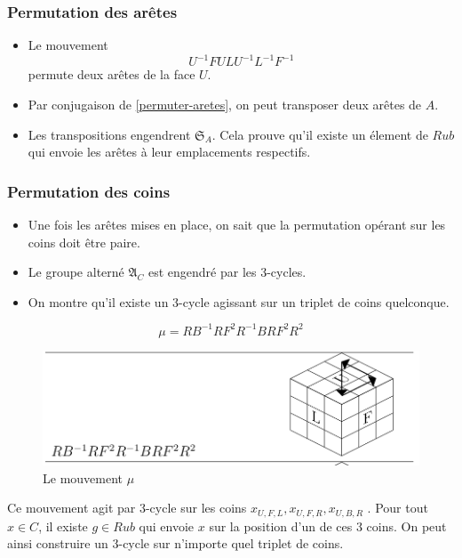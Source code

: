 \documentclass[10pt,notheorems]{beamer}
\theoremstyle{plain}
\theoremstyle{definition}
\theoremstyle{plain}
\theoremstyle{plain}
\theoremstyle{plain}
\theoremstyle{remark}
\begin{document}
\begin{frame}
  \frametitle{Permutation des arêtes}
  \begin{itemize}
    \item Le mouvement
    \begin{equation}\label{permuter-aretes}
      U ^{-1} F U L U ^{-1} L ^{-1} F ^{-1}
    \end{equation}
    permute deux arêtes de la face $U$.
    \item Par conjugaison de \ref{permuter-aretes}, on peut transposer deux arêtes de $A$.
    \item Les transpositions engendrent $\mathfrak{S}_{A} $. Cela prouve qu'il existe un élement de $Rub$ qui envoie les arêtes à leur emplacements respectifs.
  \end{itemize}


\end{frame}

\begin{frame}
  \frametitle{Permutation des coins}
    \begin{itemize}
      \item Une fois les arêtes mises en place, on sait que la permutation opérant sur les coins doit être paire.
      \item Le groupe alterné $\mathfrak{A}_C$ est engendré par les 3-cycles.
      \item On montre qu'il existe un 3-cycle agissant sur un triplet de coins quelconque.
    \end{itemize}

    \begin{equation*}
      \mu = RB ^{-1}  RF ^2 R ^{-1}  BRF ^2 R ^2
    \end{equation*}

    \begin{figure}[h!]
      \includegraphics[scale=0.2]{figures/3_cycle_coin.png}
      \caption{Le mouvement $\mu$}
      \label{}
    \end{figure}

    Ce mouvement agit par 3-cycle sur les coins $ x _{U,F,L}, x _{U,F,R}, x _{U,B,R} $ . Pour tout $x \in C$, il existe $g \in Rub$ qui envoie $x$ sur la position d'un de ces 3 coins. On peut ainsi construire un 3-cycle sur n'importe quel triplet de coins.
\end{frame}
\end{document}
